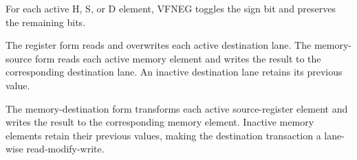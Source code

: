 For each active H, S, or D element, VFNEG toggles the sign bit and preserves
the remaining bits.

The register form reads and overwrites each active destination lane. The
memory-source form reads each active memory element and writes the result to the
corresponding destination lane. An inactive destination lane retains its
previous value.

The memory-destination form transforms each active source-register element and
writes the result to the corresponding memory element. Inactive memory elements
retain their previous values, making the destination transaction a lane-wise
read-modify-write.

